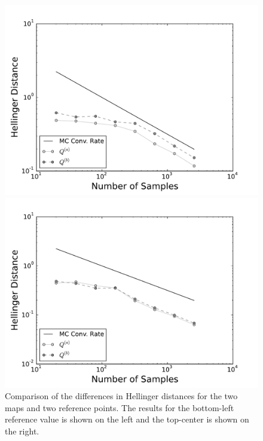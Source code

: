 \begin{figure}[h]
\begin{minipage}{.475\textwidth}
\includegraphics[width=\linewidth]{./images/pt0Plot-reg_BigN_40000_reg_M_1_rand_I_100000}
\end{minipage}
\begin{minipage}{.475\textwidth}
\includegraphics[width=\linewidth]{./images/pt5Plot-reg_BigN_40000_reg_M_1_rand_I_100000}
\end{minipage}
\caption{Comparison of the differences in Hellinger distances for the two maps and two reference points. The results for the bottom-left reference value is shown on the left and the top-center is shown on the right.}
\label{fig:NLHD}
\end{figure}

